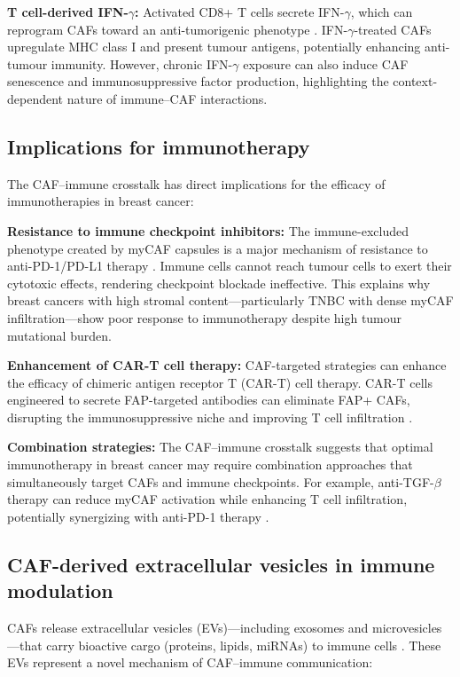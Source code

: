 \textbf{T cell-derived IFN-$\gamma$:} Activated CD8+ T cells secrete IFN-$\gamma$, which can reprogram CAFs toward an anti-tumorigenic phenotype \citep{kato2018}. IFN-$\gamma$-treated CAFs upregulate MHC class I and present tumour antigens, potentially enhancing anti-tumour immunity. However, chronic IFN-$\gamma$ exposure can also induce CAF senescence and immunosuppressive factor production, highlighting the context-dependent nature of immune--CAF interactions.

\subsection{Implications for immunotherapy}

The CAF--immune crosstalk has direct implications for the efficacy of immunotherapies in breast cancer:

\textbf{Resistance to immune checkpoint inhibitors:} The immune-excluded phenotype created by myCAF capsules is a major mechanism of resistance to anti-PD-1/PD-L1 therapy \citep{chhabra2023}. Immune cells cannot reach tumour cells to exert their cytotoxic effects, rendering checkpoint blockade ineffective. This explains why breast cancers with high stromal content---particularly TNBC with dense myCAF infiltration---show poor response to immunotherapy despite high tumour mutational burden.

\textbf{Enhancement of CAR-T cell therapy:} CAF-targeted strategies can enhance the efficacy of chimeric antigen receptor T (CAR-T) cell therapy. CAR-T cells engineered to secrete FAP-targeted antibodies can eliminate FAP+ CAFs, disrupting the immunosuppressive niche and improving T cell infiltration \citep{wang2014}.

\textbf{Combination strategies:} The CAF--immune crosstalk suggests that optimal immunotherapy in breast cancer may require combination approaches that simultaneously target CAFs and immune checkpoints. For example, anti-TGF-$\beta$ therapy can reduce myCAF activation while enhancing T cell infiltration, potentially synergizing with anti-PD-1 therapy \citep{chhabra2023}.

\subsection{CAF-derived extracellular vesicles in immune modulation}

CAFs release extracellular vesicles (EVs)---including exosomes and microvesicles---that carry bioactive cargo (proteins, lipids, miRNAs) to immune cells \citep{zhao2023}. These EVs represent a novel mechanism of CAF--immune communication:

